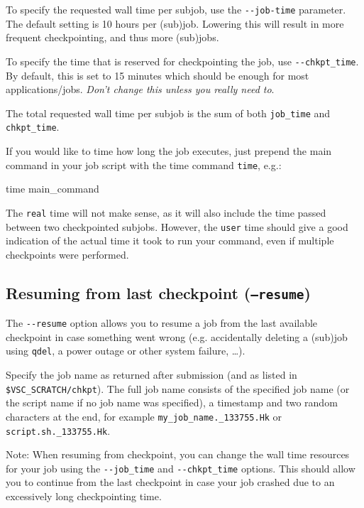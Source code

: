 To specify the requested wall time per subjob, use the \lstinline|--job-time| parameter.
The default setting is 10 hours per (sub)job. Lowering this will result in more
frequent checkpointing, and thus more (sub)jobs.

To specify the time that is reserved for checkpointing the job, use \lstinline|--chkpt_time|.
By default, this is set to 15 minutes which should be enough for most applications/jobs.
\emph{Don't change this unless you really need to}.

The total requested wall time per subjob is the sum of both \lstinline|job_time| and \lstinline|chkpt_time|.

If you would like to time how long the job executes, just prepend the main command in your job script with
the time command \lstinline|time|, e.g.:

\begin{prompt}
time main_command
\end{prompt}

The \lstinline|real| time will not make sense, as it will also include the time
passed between two checkpointed subjobs. However, the \lstinline|user| time should give a good
indication of the actual time it took to run your command, even if multiple checkpoints were performed.

\subsection{Resuming from last checkpoint (\texttt{--resume})}

The \lstinline|--resume| option allows you to resume a job from the
last available checkpoint in case something went wrong
(e.g. accidentally deleting a (sub)job using \lstinline|qdel|, a power outage or other system failure, \ldots).

\the\year\the\month\the\day

Specify the job name as returned after submission (and as listed in \texttt{\$VSC\_SCRATCH/chkpt}).
The full job name consists of the specified job name (or the script name if no job name was specified),
a timestamp and two random characters at the end, for example \texttt{my\_job\_name.\the{}\_133755.Hk}
or \texttt{script.sh.\the{}\_133755.Hk}.

Note: When resuming from checkpoint, you can change the wall time resources for your job using the \lstinline|--job_time| and
\lstinline|--chkpt_time| options. This should allow you to continue from the last checkpoint
in case your job crashed due to an excessively long checkpointing time.

